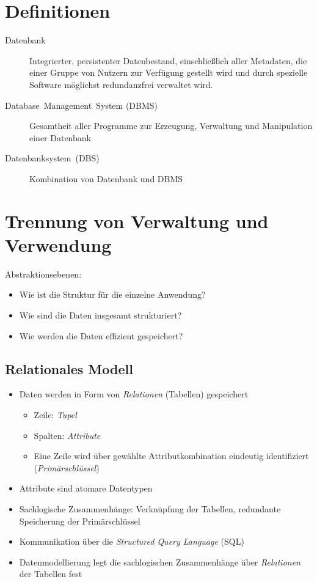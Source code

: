 \section{Definitionen}
\begin{description}
  \item [{Datenbank}] 
	Integrierter, persistenter Datenbestand, einschließlich aller Metadaten, die einer Gruppe von Nutzern zur Verfügung
	gestellt wird und durch spezielle Software möglichst redundanzfrei verwaltet wird.
  \item [{Database~Management~System (DBMS)}] 
	Gesamtheit aller Programme zur Erzeugung, Verwaltung und Manipulation einer Datenbank
  \item [{Datenbanksystem~(DBS)}] 
	Kombination von Datenbank und DBMS
\end{description}

\section{Trennung von Verwaltung und Verwendung}

Abstraktionsebenen:
\begin{itemize}
  \item Wie ist die Struktur für die einzelne Anwendung?
  \item Wie sind die Daten insgesamt strukturiert?
  \item Wie werden die Daten effizient gespeichert?
\end{itemize}

\subsection{Relationales Modell}
\begin{itemize}
  \item Daten werden in Form von \emph{Relationen} (Tabellen) gespeichert
      \begin{itemize}
	\item Zeile: \emph{Tupel}
	\item Spalten: \emph{Attribute}
	\item Eine Zeile wird über gewählte Attributkombination eindeutig identifiziert (\emph{Primärschlüssel})
      \end{itemize}
  \item Attribute sind atomare Datentypen
  \item Sachlogische Zusammenhänge: Verknüpfung der Tabellen, redundante Speicherung der Primärschlüssel
  \item Kommunikation über die \emph{Structured Query Language} (SQL)
  \item Datenmodellierung legt die sachlogischen Zusammenhänge über \emph{Relationen} der Tabellen fest
\end{itemize}

